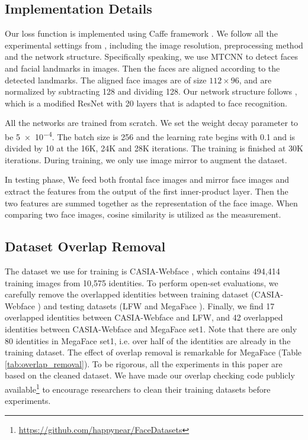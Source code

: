 \documentclass[10pt,twocolumn,letterpaper]{article}
\begin{document}
\subsection{Implementation Details}

Our loss function is implemented using Caffe framework \cite{jia2014caffe}. We follow all the experimental settings from \cite{liu2017sphereface}, including the image resolution, preprocessing method and the network structure.
Specifically speaking, we use MTCNN \cite{zhang2016joint} to detect faces and facial landmarks in images. Then the faces are aligned according to the detected landmarks. The aligned face images are of size $112\times 96$, and are normalized by subtracting 128 and dividing 128. Our network structure follows \cite{liu2017sphereface}, which is a modified ResNet \cite{he2016deep} with 20 layers that is adapted to face recognition.

All the networks are trained from scratch. We set the weight decay parameter to be \num{5e-4}. The batch size is 256 and the learning rate begins with 0.1 and is divided by 10 at the 16K, 24K and 28K iterations. The training is finished at 30K iterations. During training, we only use image mirror to augment the dataset. 

In testing phase, We feed both frontal face images and mirror face images and extract the features from the output of the first inner-product layer. Then the two features are summed together as the representation of the face image. When comparing two face images, cosine similarity is utilized as the measurement. 


\subsection{Dataset Overlap Removal}

The dataset we use for training is CASIA-Webface \cite{yi2014learning}, which contains 494,414 training images from 10,575 identities. To perform open-set evaluations, we carefully remove the overlapped identities between training dataset (CASIA-Webface \cite{yi2014learning}) and testing datasets (LFW\cite{huang2007labeled} and MegaFace \cite{kemelmacher2016megaface}). Finally, we find 17 overlapped identities between CASIA-Webface and LFW, and 42 overlapped identities between CASIA-Webface and MegaFace set1. Note that there are only 80 identities in MegaFace set1, i.e. over half of the identities are already in the training dataset. The effect of overlap removal is remarkable for MegaFace (Table \ref{tab:overlap_removal}). To be rigorous, all the experiments in this paper are based on the cleaned dataset. We have made our overlap checking code publicly available\footnote{\url{https://github.com/happynear/FaceDatasets}} to encourage researchers to clean their training datasets before experiments.
\end{document}
